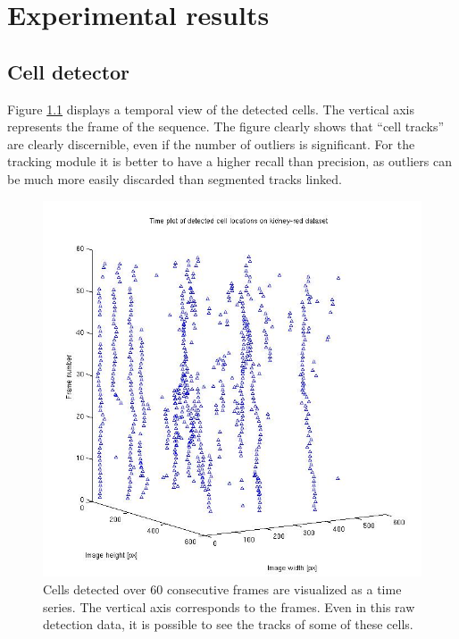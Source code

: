 \chapter{Experimental results }
\label{chap:results}
\notyetimplemented{}
	\section{Cell detector }
		
	
		Figure \ref{fig:cell_tracks_detection} displays a temporal view of the detected cells. The vertical axis represents the frame of the sequence. The figure clearly shows that ``cell tracks'' are clearly discernible, even if the number of outliers is significant. For the tracking module it is better to have a higher recall than precision, as outliers can be much more easily discarded than segmented tracks linked.
		\begin{figure}
			  \includegraphics[width=\textwidth]{images/cell_tracks}
			\caption{Cells detected over 60 consecutive frames are visualized as a time series. The vertical axis corresponds to the frames. Even in this raw detection data, it is possible to see the tracks of some of these cells.}
		    \label{fig:cell_tracks_detection}
		\end{figure}
		
